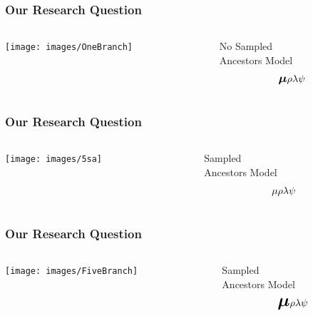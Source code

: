 \documentclass[]{beamer}
\begin{document}
\begin{frame}
\frametitle{Our Research Question}
\begin{columns}
\begin{column}{0.5\textwidth}
\texttt{[image: images/OneBranch]} \\
\end{column}
\begin{column}{0.5\textwidth}
\begin{center}
No Sampled \\ Ancestors Model \\
\[ \mathlarger{\boldsymbol{\mu}} \\
\rho \\
\lambda \\
 \psi \]
\end{center}
\end{column}
\end{columns}

\end{frame}


\begin{frame}
\frametitle{Our Research Question}
\begin{columns}
\begin{column}{0.5\textwidth}
\texttt{[image: images/5sa]} \\
\end{column}
\begin{column}{0.5\textwidth}
\begin{center}
Sampled \\ Ancestors Model \\
\[\mu \\
\rho \\
\lambda \\
 \psi \]
\end{center}
\end{column}
\end{columns}
\end{frame}

\begin{frame}
\frametitle{Our Research Question}
\begin{columns}
\begin{column}{0.5\textwidth}
\texttt{[image: images/FiveBranch]} \\
\end{column}
\begin{column}{0.5\textwidth}
\begin{center}
Sampled \\ Ancestors Model \\
\[\mathlarger{\mathlarger{\mathlarger{\boldsymbol{\mu}}}}\\
\rho \\
\lambda \\
 \psi \]
\end{center}
\end{column}
\end{columns}
\end{frame}
\end{document}

